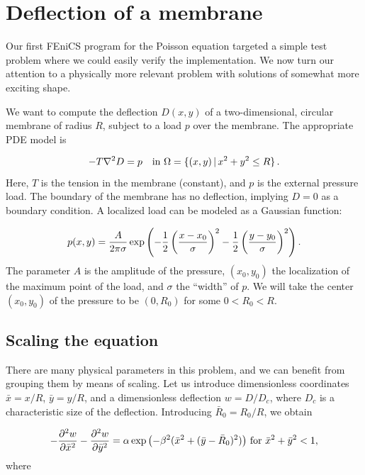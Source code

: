 \documentclass[graybox,envcountchap,sectrefs,final]{svmonodo}
\begin{document}
\section{Deflection of a membrane}
\label{ch:poisson0:membrane}

Our first FEniCS program for the Poisson equation targeted a
simple test problem where we could easily verify the
implementation. We now turn our attention to a physically more
relevant problem with solutions of somewhat more exciting shape.

We want to compute the deflection $D(x,y)$ of a two-dimensional,
circular membrane of radius $R$, subject to a load $p$ over the
membrane. The appropriate PDE model is

\begin{equation}
-T\nabla^2 D = p\quad\hbox{in }\Omega = \{ (x,y)\,\vert\, x^2+y^2\leq R\}\tp
\end{equation}
Here, $T$ is the tension in the membrane (constant), and $p$ is the external
pressure load.
The boundary of the membrane has no
deflection, implying $D=0$ as a boundary condition.
A localized load can be modeled as a Gaussian function:

\begin{equation}
p(x,y) = {A\over 2\pi\sigma}\exp{\left(
- {1\over2}\left( {x-x_0\over\sigma}\right)^2
- {1\over2}\left( {y-y_0\over\sigma}\right)^2
\right)}\, .
\end{equation}
The parameter $A$ is the amplitude of the pressure, $(x_0,y_0)$ the
localization of the maximum point of the load, and $\sigma$ the
``width'' of $p$. We will take the center $(x_0,y_0)$ of the pressure
to be $(0, R_0)$ for some $0 < R_0 < R$.

\subsection{Scaling the equation}

There are many physical parameters in this problem, and we can benefit
from grouping them by means of scaling. Let us introduce dimensionless
coordinates $\bar x = x/R$, $\bar y = y/R$, and a dimensionless
deflection $w=D/D_c$, where $D_c$ is a characteristic size of the
deflection. Introducing $\bar R_0=R_0/R$, we obtain

\[ -\frac{\partial^2 w}{\partial\bar x^2}
-\frac{\partial^2 w}{\partial\bar y^2}= \alpha
\exp{\left(
- \beta^2(\bar x^2
+ (\bar y-\bar R_0)^2)\right)}\hbox{ for } \bar x^2 + \bar y^2 < 1,\]
where
\end{document}
